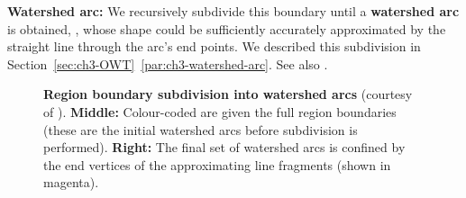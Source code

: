 \textbf{Watershed arc:} We recursively subdivide this boundary until a \textbf{watershed arc} is obtained, , whose shape could be sufficiently accurately approximated by the straight line through the arc's end points. We described this subdivision in Section~\ref*{sec:ch3-OWT}~\ref{par:ch3-watershed-arc}. See also .

\begin{figure}[t]
 \centering
 \caption[Region boundary subdivision into watershed arcs]{{\bf Region boundary subdivision into {\bf watershed arcs}} (courtesy of \cite{Arbelaez09}). {\bf Middle:} Colour-coded are given the full region boundaries (these are the initial watershed arcs before subdivision is performed). {\bf Right:} The final set of watershed arcs is confined by %
 the end vertices of the approximating line fragments (shown in magenta).}
 \label{fig:Arbelaez09-watershed-arcs}
\end{figure}

